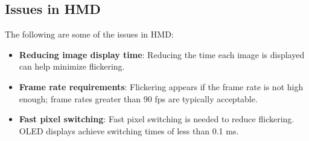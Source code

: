 \documentclass[11pt,a4paper]{article}
\theoremstyle{definition}
\theoremstyle{plain}
\theoremstyle{remark}
\begin{document}
\subsection{Issues in HMD}
The following are some of the issues in HMD:
\begin{itemize}
    \item \textbf{Reducing image display time}: Reducing the time each image is displayed can help minimize flickering.
    \item \textbf{Frame rate requirements}: Flickering appears if the frame rate is not high enough; frame rates greater than 90 fps are typically acceptable.
    \item \textbf{Fast pixel switching}: Fast pixel switching is needed to reduce flickering. OLED displays achieve switching times of less than 0.1 ms.
\end{itemize}
\end{document}
